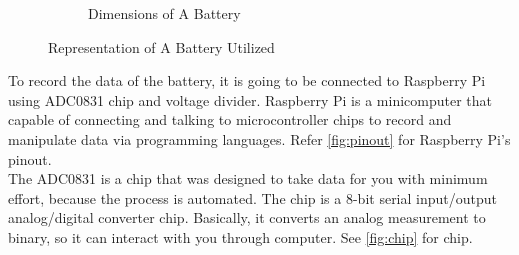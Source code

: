 \begin{figure}[h!]
\begin{subfigure}{.3\textwidth}
  \caption{Dimensions of A Battery}
  \label{fig:sub2}
\end{subfigure}
\caption{Representation of A Battery Utilized}
\label{fig:battery}
\end{figure}
To record the data of the battery, it is going to be connected to Raspberry Pi using ADC0831 chip and voltage divider. Raspberry Pi is a minicomputer that capable of connecting and talking to microcontroller chips to record and manipulate data via programming languages. Refer \autoref{fig:pinout} for Raspberry Pi's pinout. \\
The ADC0831 is a chip that was designed to take data for you with minimum effort, because the process is automated. The chip is a 8-bit serial input/output analog/digital converter chip. Basically, it converts an analog measurement to binary, so it can interact with you through computer.\citep{adcdatasheet} See \autoref{fig:chip} for chip. \newpage
